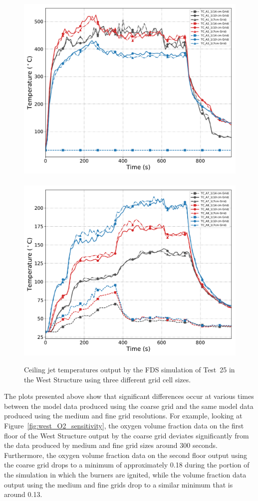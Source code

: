 \begin{figure}[!h]
	\centering
	\includegraphics[width=0.87\columnwidth]{Figures/Plots/Grid_Sensitivity/Temperature/Test_25_cjet_1}
	\\~\\
	\includegraphics[width=0.87\columnwidth]{Figures/Plots/Grid_Sensitivity/Temperature/Test_25_cjet_2}
	\caption[Ceiling jet temperatures for West Structure simulation with different grid cell sizes.]{Ceiling jet temperatures output by the FDS simulation of Test~25 in the West Structure using three different grid cell sizes.}
	\label{fig:west_cjet_sensitivity}
\end{figure}

\FloatBarrier

The plots presented above show that significant differences occur at various times between the model data produced using the coarse grid and the same model data produced using the medium and fine grid resolutions. For example, looking at Figure~\ref{fig:west_O2_sensitivity}, the oxygen volume fraction data on the first floor of the West Structure output by the coarse grid deviates significantly from the data produced by medium and fine grid sizes around 300 seconds. Furthermore, the oxygen volume fraction data on the second floor output using the coarse grid drops to a minimum of approximately 0.18 during the portion of the simulation in which the burners are ignited, while the volume fraction data output using the medium and fine grids drop to a similar minimum that is around 0.13. 

